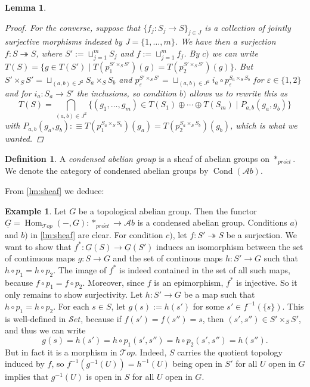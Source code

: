 \documentclass[11pt,A4]{article}
\theoremstyle{plain}
\newtheorem{lm}[thm]{Lemma}
\theoremstyle{definition}
\newtheorem{defn}[thm]{Definition}
\newtheorem{exa}[thm]{Example}
\theoremstyle{remark}
\newcommand{\1}{\mathbbm{1}}
\newcommand{\Top}{\mathscr{T}op}
\newcommand{\Ab}{\mathscr{A}b}
\newcommand{\Set}{\mathscr{S}et}
\DeclareMathOperator{\Hom}{Hom}
\DeclareMathOperator{\Cond}{Cond}
\newcommand{\pe}{*_{pro\acute et}}
\renewcommand{\u}[1]{\underline{#1}}
\newcommand{\op}{\oplus}
\newcommand{\fp}[1]{\times_{#1}}
\begin{document}
\begin{lm}
\begin{proof}
	For the converse, suppose that $\{f_{j}\colon S_{j}\to S\}_{j\in J}$ is a collection of jointly surjective morphisms indexed by $J=\{ 1,\ldots,m\}$.
	We have then a surjection $f\colon S \twoheadrightarrow S$, where $S':=\sqcup_{j=1}^{m}S_{j}$ and $f:=\sqcup_{j=1}^{m}f_{j}$.
	By $c)$ we can write $T(S)=\{ g\in T(S')\mid T(p_{1}^{S'\fp{S}S'})(g)=T(p_{2}^{S'\fp{S}S'})(g)\}$.
	But $S'\fp{S}S'=\sqcup_{(a,b)\in J^{2}} S_{a}\fp{S}S_{b}$ and $p_{\varepsilon }^{S'\fp{S}S'}=\sqcup_{(a,b)\in J^{2}} i_{a}\circ p_{\varepsilon }^{S_{a}\fp{S}S_{b}}$ for $\varepsilon \in \{1,2\}$ and for $i_{a}\colon S_{a}\to S'$ the inclusions, so condition $b)$ allows us to rewrite this as
	\[ T(S)=\bigcap_{(a,b)\in J^{2}} \{ (g_{1},\ldots,g_{m})\in T(S_{1})\op \cdots \op T(S_{m})\mid P_{a,b}(g_{a},g_{b})\}\]
	with $P_{a,b}(g_{a},g_{b}):\equiv T(p_{1}^{S_{a}\fp{S}S_{b}})(g_{a})=T(p_{2}^{S_{a}\fp{S}S_{b}})(g_{b})$, which is what we wanted.	
    \end{proof}
\end{lm}

\begin{defn}
    A \textit{condensed abelian group} is a sheaf of abelian groups on $\pe$.
    We denote the category of condensed abelian groups by $\Cond(\Ab)$.
\end{defn}

From \cref{lm:sheaf} we deduce:

\begin{exa}
    Let $G$ be a topological abelian group. Then the functor $\u{G}=\Hom_{\Top}(-,G)\colon \pe\to \Ab$ is a condensed abelian group.
    Conditions $a)$ and $b)$ in \cref{lm:sheaf} are clear.
    For condition $c)$, let $f\colon S'\twoheadrightarrow S$ be a surjection.
    We want to show that $f^{*}\colon \u{G}(S)\to \u{G}(S')$ induces an isomorphism between the set of continuous maps $g\colon S\to G$ and the set of continous maps $h\colon S'\to G$ such that $h\circ p_{1}=h\circ p_{2}$.
    The image of $f^{*}$ is indeed contained in the set of all such maps, because $f\circ p_{1}=f\circ p_{2}$.
    Moreover, since $f$ is an epimorphism, $f^{*}$ is injective.
    So it only remains to show surjectivity.
    Let $h\colon S'\to G$ be a map such that $h\circ p_{1}=h\circ p_{2}$.
    For each $s\in S$, let $g(s):=h(s')$ for some $s'\in f^{-1}(\{s\})$.
    This is well-defined in $\Set$, because if $f(s')=f(s'')=s$, then $(s',s'')\in S'\times_{S}S'$, and thus we can write
    \[ g(s)=h(s')=h\circ p_{1}(s',s'')=h\circ p_{2}(s',s'')=h(s'').\]
    But in fact it is a morphism in $\Top$.
    Indeed, $S$ carries the quotient topology induced by $f$, so $f^{-1}(g^{-1}(U))=h^{-1}(U)$ being open in $S'$ for all $U$ open in $G$ implies that $g^{-1}(U)$ is open in $S$ for all $U$ open in $G$.
\end{exa}
\end{document}
